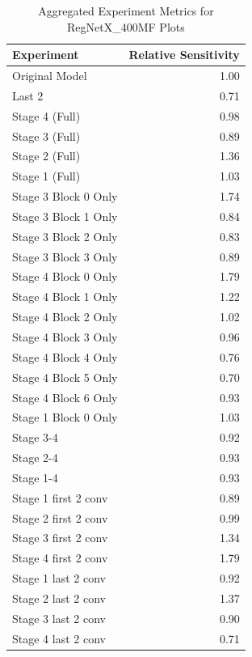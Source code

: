 \begin{table}
\caption{Aggregated Experiment Metrics for RegNetX_400MF Plots}
\label{tab:exp_plot_data_regnetx_400mf}
\begin{tabular}{lr}
\toprule
Experiment & Relative Sensitivity \\
\midrule
Original Model & 1.00 \\
Last 2 & 0.71 \\
Stage 4 (Full) & 0.98 \\
Stage 3 (Full) & 0.89 \\
Stage 2 (Full) & 1.36 \\
Stage 1 (Full) & 1.03 \\
Stage 3 Block 0 Only & 1.74 \\
Stage 3 Block 1 Only & 0.84 \\
Stage 3 Block 2 Only & 0.83 \\
Stage 3 Block 3 Only & 0.89 \\
Stage 4 Block 0 Only & 1.79 \\
Stage 4 Block 1 Only & 1.22 \\
Stage 4 Block 2 Only & 1.02 \\
Stage 4 Block 3 Only & 0.96 \\
Stage 4 Block 4 Only & 0.76 \\
Stage 4 Block 5 Only & 0.70 \\
Stage 4 Block 6 Only & 0.93 \\
Stage 1 Block 0 Only & 1.03 \\
Stage 3-4 & 0.92 \\
Stage 2-4 & 0.93 \\
Stage 1-4 & 0.93 \\
Stage 1 first 2 conv & 0.89 \\
Stage 2 first 2 conv & 0.99 \\
Stage 3 first 2 conv & 1.34 \\
Stage 4 first 2 conv & 1.79 \\
Stage 1 last 2 conv & 0.92 \\
Stage 2 last 2 conv & 1.37 \\
Stage 3 last 2 conv & 0.90 \\
Stage 4 last 2 conv & 0.71 \\
\bottomrule
\end{tabular}
\end{table}

